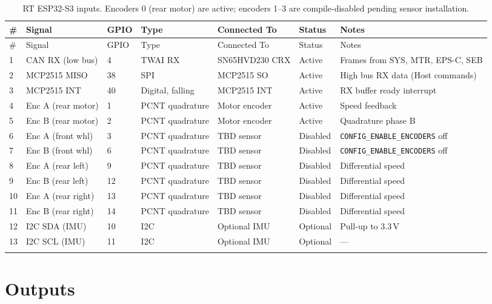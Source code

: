 \documentclass[12pt,a4paper,oneside]{report}
\begin{document}
\begin{center}
\begin{longtable}{p{4mm} p{38mm} p{8mm} p{22mm} p{42mm} p{16mm} p{35mm}}
\toprule
\# & Signal & GPIO & Type & Connected To & Status & Notes \\
\midrule
\endfirsthead
\toprule
\# & Signal & GPIO & Type & Connected To & Status & Notes \\
\midrule
\endhead
1  & CAN RX (low bus)   & 4  & TWAI RX    & SN65HVD230 CRX     & Active   & Frames from SYS, MTR, EPS-C, SEB \\
2  & MCP2515 MISO       & 38 & SPI        & MCP2515 SO         & Active   & High bus RX data (Host commands) \\
3  & MCP2515 INT        & 40 & Digital, falling & MCP2515 INT   & Active   & RX buffer ready interrupt \\
4  & Enc A (rear motor) & 1  & PCNT quadrature & Motor encoder & Active   & Speed feedback \\
5  & Enc B (rear motor) & 2  & PCNT quadrature & Motor encoder & Active   & Quadrature phase B \\
6  & Enc A (front whl)  & 3  & PCNT quadrature & TBD sensor    & Disabled & \texttt{CONFIG\_ENABLE\_ENCODERS} off \\
7  & Enc B (front whl)  & 6  & PCNT quadrature & TBD sensor    & Disabled & \texttt{CONFIG\_ENABLE\_ENCODERS} off \\
8  & Enc A (rear left)  & 9  & PCNT quadrature & TBD sensor    & Disabled & Differential speed \\
9  & Enc B (rear left)  & 12 & PCNT quadrature & TBD sensor    & Disabled & Differential speed \\
10 & Enc A (rear right) & 13 & PCNT quadrature & TBD sensor    & Disabled & Differential speed \\
11 & Enc B (rear right) & 14 & PCNT quadrature & TBD sensor    & Disabled & Differential speed \\
12 & I2C SDA (IMU)      & 10 & I2C         & Optional IMU       & Optional  & Pull-up to 3.3\,V \\
13 & I2C SCL (IMU)      & 11 & I2C         & Optional IMU       & Optional  & --- \\
\bottomrule
\caption{RT ESP32-S3 inputs. Encoders 0 (rear motor) are active; encoders 1--3 are compile-disabled pending sensor installation.}
\end{longtable}
\end{center}

\section{Outputs}
\end{document}
